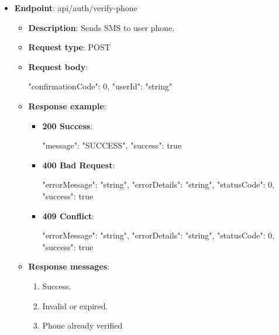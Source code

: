 \begin{itemize}
    \item \textbf{Endpoint}: api/auth/verify-phone
    \begin{itemize}
        \item \textbf{Description}: Sends SMS to user phone.
        \item \textbf{Request type}: POST
        \item \textbf{Request body}:
        \begin{spverbatim}
        {
            "confirmationCode": 0,
            "userId": "string"
        }
        \end{spverbatim}
        \item  \textbf{Response example}:
        \begin{itemize}
            \item \textbf{200 Success}:
            \begin{spverbatim}
            {
                "message": "SUCCESS",
                "success": true
            }
            \end{spverbatim}
            \item \textbf{400 Bad Request}:
            \begin{spverbatim}
            {
                "errorMessage": "string",
                "errorDetails": "string",
                "statusCode": 0,
                "success": true
            }
            \end{spverbatim}
            \item \textbf{409 Conflict}:
            \begin{spverbatim}
            {
                "errorMessage": "string",
                "errorDetails": "string",
                "statusCode": 0,
                "success": true
            }
            \end{spverbatim}
        \end{itemize}
        \item \textbf{Response messages}:
        \begin{enumerate}
            \item Success.
            \item Invalid or expired.
            \item Phone already verified
        \end{enumerate}
    \end{itemize}


\end{itemize}
